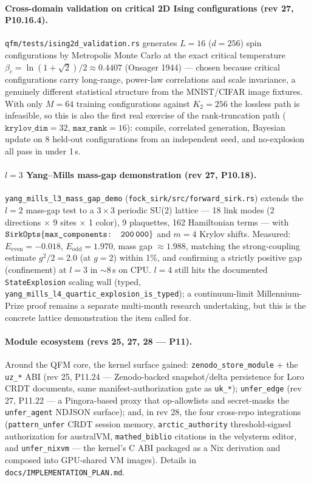 \documentclass[11pt, a4paper]{article}
\begin{document}
\paragraph{Cross-domain validation on critical 2D Ising configurations
(rev 27, P10.16.4).} \texttt{qfm/tests/ising2d\_validation.rs} generates
$L=16$ ($d=256$) spin configurations by Metropolis Monte Carlo at the
exact critical temperature $\beta_c=\ln(1+\sqrt 2)/2\approx 0.4407$
(Onsager 1944) --- chosen because critical configurations carry
long-range, power-law correlations and scale invariance, a genuinely
different statistical structure from the MNIST/CIFAR image fixtures.
With only $M=64$ training configurations against $K_2=256$ the lossless
path is infeasible, so this is also the first real exercise of the
rank-truncation path ($\texttt{krylov\_dim}=32$, $\texttt{max\_rank}=16$):
compile, correlated generation, Bayesian update on 8 held-out
configurations from an independent seed, and no-explosion all pass in
under 1\,s.

\paragraph{$l=3$ Yang--Mills mass-gap demonstration (rev 27, P10.18).}
\texttt{yang\_mills\_l3\_mass\_gap\_demo}
(\texttt{fock\_sirk/src/forward\_sirk.rs}) extends the $l=2$ mass-gap
test to a $3\times 3$ periodic SU(2) lattice --- 18 link modes
(2 directions $\times$ 9 sites $\times$ 1 color), 9 plaquettes, 162
Hamiltonian terms --- with
$\texttt{SirkOpts}\{\texttt{max\_components: 200\,000}\}$ and $m=4$
Krylov shifts. Measured: $E_{\mathrm{even}}=-0.018$,
$E_{\mathrm{odd}}=1.970$, mass gap $\approx 1.988$, matching the
strong-coupling estimate $g^2/2=2.0$ (at $g=2$) within 1\%, and
confirming a strictly positive gap (confinement) at $l=3$ in $\sim$8\,s
on CPU. $l=4$ still hits the documented \texttt{StateExplosion} scaling
wall (typed, \texttt{yang\_mills\_l4\_quartic\_explosion\_is\_typed});
a continuum-limit Millennium-Prize proof remains a separate multi-month
research undertaking, but this is the concrete lattice demonstration the
item called for.

\paragraph{Module ecosystem (revs 25, 27, 28 --- P11).} Around the QFM
core, the kernel surface gained: \texttt{zenodo\_store\_module} + the
\texttt{uz\_*} ABI (rev 25, P11.24 --- Zenodo-backed snapshot/delta
persistence for Loro CRDT documents, same manifest-authorization gate as
\texttt{uk\_*}); \texttt{unfer\_edge} (rev 27, P11.22 --- a Pingora-based
proxy that op-allowlists and secret-masks the \texttt{unfer\_agent}
NDJSON surface); and, in rev 28, the four cross-repo integrations
(\texttt{pattern\_unfer} CRDT session memory, \texttt{arctic\_authority}
threshold-signed authorization for australVM, \texttt{mathed\_biblio}
citations in the velysterm editor, and \texttt{unfer\_nixvm} --- the
kernel's C ABI packaged as a Nix derivation and composed into GPU-shared
VM images). Details in \texttt{docs/IMPLEMENTATION\_PLAN.md}.
\end{document}
